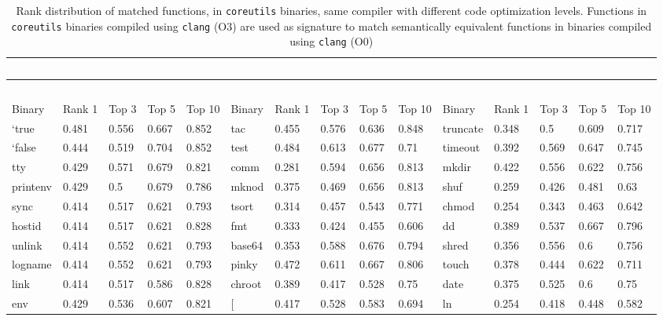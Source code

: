 \begin{table*}[h!]
	\begin{center}
		\caption{Rank distribution of matched functions, in \texttt{coreutils} binaries, same compiler with different code optimization levels. Functions in \texttt{coreutils} binaries compiled using \texttt{clang} (O3) are used as signature to match semantically  equivalent functions in binaries compiled using \texttt{clang} (O0)\\}
		\label{tab:x86_gcc_O3_clang_O0}
		\scriptsize
\begin{tabular}{ | l | l | l | l | l | l | l | l | l | l | l | l | l | l | l | }
\hline
	\  & \  & \  & \  & \  & \  & \  & \  & \  & \  & \  & \  & \  & \  & \  \\ \hline
	\  & \  & \  & \  & \  & \  & \  & \  & \  & \  & \  & \  & \  & \  & \  \\ \hline
	Binary & Rank 1 & Top 3 & Top 5 & Top 10 & Binary & Rank 1 & Top 3 & Top 5 & Top 10 & Binary & Rank 1 & Top 3 & Top 5 & Top 10 \\ \hline
	`true & 0.481 & 0.556 & 0.667 & 0.852 & tac & 0.455 & 0.576 & 0.636 & 0.848 & truncate & 0.348 & 0.5 & 0.609 & 0.717 \\ \hline
	`false & 0.444 & 0.519 & 0.704 & 0.852 & test & 0.484 & 0.613 & 0.677 & 0.71 & timeout & 0.392 & 0.569 & 0.647 & 0.745 \\ \hline
	tty & 0.429 & 0.571 & 0.679 & 0.821 & comm & 0.281 & 0.594 & 0.656 & 0.813 & mkdir & 0.422 & 0.556 & 0.622 & 0.756 \\ \hline
	printenv & 0.429 & 0.5 & 0.679 & 0.786 & mknod & 0.375 & 0.469 & 0.656 & 0.813 & shuf & 0.259 & 0.426 & 0.481 & 0.63 \\ \hline
	sync & 0.414 & 0.517 & 0.621 & 0.793 & tsort & 0.314 & 0.457 & 0.543 & 0.771 & chmod & 0.254 & 0.343 & 0.463 & 0.642 \\ \hline
	hostid & 0.414 & 0.517 & 0.621 & 0.828 & fmt & 0.333 & 0.424 & 0.455 & 0.606 & dd & 0.389 & 0.537 & 0.667 & 0.796 \\ \hline
	unlink & 0.414 & 0.552 & 0.621 & 0.793 & base64 & 0.353 & 0.588 & 0.676 & 0.794 & shred & 0.356 & 0.556 & 0.6 & 0.756 \\ \hline
	logname & 0.414 & 0.552 & 0.621 & 0.793 & pinky & 0.472 & 0.611 & 0.667 & 0.806 & touch & 0.378 & 0.444 & 0.622 & 0.711 \\ \hline
	link & 0.414 & 0.517 & 0.586 & 0.828 & chroot & 0.389 & 0.417 & 0.528 & 0.75 & date & 0.375 & 0.525 & 0.6 & 0.75 \\ \hline
	env & 0.429 & 0.536 & 0.607 & 0.821 & [ & 0.417 & 0.528 & 0.583 & 0.694 & ln & 0.254 & 0.418 & 0.448 & 0.582 \\ \hline

\end{tabular}
\end{center}
\end{table*}
